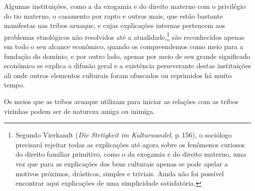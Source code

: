 Algumas instituições, como a da exogamia e do direito materno com o
privilégio do tio materno, o casamento por rapto e outros mais, que
estão bastante manifestas nas tribos aruaque, e cujas explicações
internas pertencem aos problemas etnológicos não resolvidos até a
atualidade,\footnote{Segundo Vierkandt (\textit{Die Stetigkeit im
  Kulturwandel}, p.\,156), o sociólogo precisará rejeitar todas as
  explicações até agora sobre os fenômenos curiosos do direito familiar
  primitivo, como o da exogamia e do direito materno, uma vez que para
  as explicações dos bens culturais apenas se pode apelar a motivos
  próximos, drásticos, simples e triviais. Ainda não foi possível
  encontrar aqui explicações de uma simplicidade satisfatória.} são
reconhecidos apenas em todo o seu alcance econômico, quando os
compreendemos como meio para a fundação do domínio, e por outro lado,
apenas por meio de seu grande significado econômico se explica a difusão
geral e a existência perseverante destas instituições ali onde outros
elementos culturais foram ofuscados ou reprimidos há muito tempo.

Os meios que as tribos aruaque utilizam para iniciar as relações com as
tribos vizinhas podem ser de natureza amiga ou inimiga.


